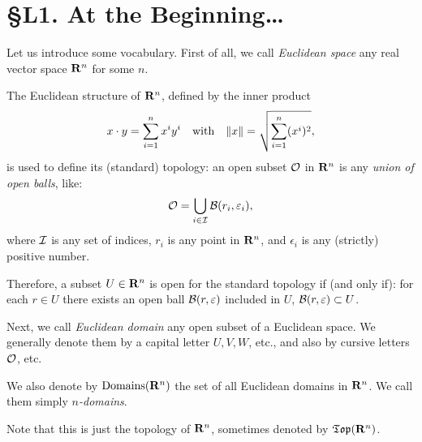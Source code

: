 
\cleardoublepage

\chapter*{\S L1. At the Beginning\dots}
\setcounter{footnote}{0}


\begin{abstract}
  This lecture presents the prerequisites for the study of diffeology.
  As we shall see,
  a good understanding of infinitely differentiable maps on Euclidean domains,
  and a few fundamental theorems of calculus,
  will be a good start.
\end{abstract}


Let us introduce some vocabulary.
First of all,
we call \emph{Euclidean space} any real vector space $\mathbf{R}^n$ for some $n$.

The Euclidean structure of $\mathbf{R}^n$,
defined by the inner product
$$%
  x \cdot y = \sum_{i=1}^n x^i y^i
  \quad \text{with} \quad
  \Norm{x} = \sqrt{\sum_{i=1}^n(x^i)^2},
  $$%
is used to define its (standard) topology:
an open subset $\mathcal{O}$ in $\mathbf{R}^n$ is any \emph{union of open balls},
like:
$$%
  \cO = \bigcup_{i \in \cI} \cB(r_i,\epsilon_i),
  $$%
where $\mathcal{I}$ is any set of indices,
$r_i$ is any point in $\mathbf{R}^n$,
and $\epsilon_i$ is any (strictly) positive number.

Therefore,
a subset $U \in \mathbf{R}^n$ is open for the standard topology if (and only if):
for each $r \in U$ there exists an open ball $\mathcal{B}(r,\varepsilon)$ included in $U$,
$\mathcal{B}(r,\varepsilon) \subset U$.

Next,
we call \emph{Euclidean domain} any open subset of a Euclidean space.
We generally denote them by a capital letter $U, V, W$, etc.,
and also by cursive letters $\mathcal{O}$, etc.

We also denote by $\mathrm{Domains}(\mathbf{R}^n)$ the set of all Euclidean domains in $\mathbf{R}^n$.
We call them simply \emph{$n$-domains}.

Note that this is just the topology of $\mathbf{R}^n$,
sometimes denoted by $\mathfrak{Top}(\mathbf{R}^n)$.

